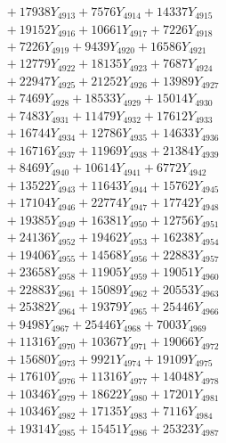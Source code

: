 \documentclass[a4paper,10pt]{article}
\begin{document}
{\begin{align}
&\;  + 17938 Y_{4913} + 7576 Y_{4914} + 14337 Y_{4915} \\[0.3ex]
&\;  + 19152 Y_{4916} + 10661 Y_{4917} + 7226 Y_{4918} \\[0.5ex]\allowbreak
&\;  + 7226 Y_{4919} + 9439 Y_{4920} + 16586 Y_{4921} \\[0.3ex]
&\;  + 12779 Y_{4922} + 18135 Y_{4923} + 7687 Y_{4924} \\[0.3ex]
&\;  + 22947 Y_{4925} + 21252 Y_{4926} + 13989 Y_{4927} \\[0.3ex]
&\;  + 7469 Y_{4928} + 18533 Y_{4929} + 15014 Y_{4930} \\[0.3ex]
&\;  + 7483 Y_{4931} + 11479 Y_{4932} + 17612 Y_{4933} \\[0.3ex]
&\;  + 16744 Y_{4934} + 12786 Y_{4935} + 14633 Y_{4936} \\[0.3ex]
&\;  + 16716 Y_{4937} + 11969 Y_{4938} + 21384 Y_{4939} \\[0.3ex]
&\;  + 8469 Y_{4940} + 10614 Y_{4941} + 6772 Y_{4942} \\[0.3ex]
&\;  + 13522 Y_{4943} + 11643 Y_{4944} + 15762 Y_{4945} \\[0.3ex]
&\;  + 17104 Y_{4946} + 22774 Y_{4947} + 17742 Y_{4948} \\[0.5ex]\allowbreak
&\;  + 19385 Y_{4949} + 16381 Y_{4950} + 12756 Y_{4951} \\[0.3ex]
&\;  + 24136 Y_{4952} + 19462 Y_{4953} + 16238 Y_{4954} \\[0.3ex]
&\;  + 19406 Y_{4955} + 14568 Y_{4956} + 22883 Y_{4957} \\[0.3ex]
&\;  + 23658 Y_{4958} + 11905 Y_{4959} + 19051 Y_{4960} \\[0.3ex]
&\;  + 22883 Y_{4961} + 15089 Y_{4962} + 20553 Y_{4963} \\[0.3ex]
&\;  + 25382 Y_{4964} + 19379 Y_{4965} + 25446 Y_{4966} \\[0.3ex]
&\;  + 9498 Y_{4967} + 25446 Y_{4968} + 7003 Y_{4969} \\[0.3ex]
&\;  + 11316 Y_{4970} + 10367 Y_{4971} + 19066 Y_{4972} \\[0.3ex]
&\;  + 15680 Y_{4973} + 9921 Y_{4974} + 19109 Y_{4975} \\[0.3ex]
&\;  + 17610 Y_{4976} + 11316 Y_{4977} + 14048 Y_{4978} \\[0.5ex]\allowbreak
&\;  + 10346 Y_{4979} + 18622 Y_{4980} + 17201 Y_{4981} \\[0.3ex]
&\;  + 10346 Y_{4982} + 17135 Y_{4983} + 7116 Y_{4984} \\[0.3ex]
&\;  + 19314 Y_{4985} + 15451 Y_{4986} + 25323 Y_{4987} \\[0.3ex]

\end{align}}
\end{document}
